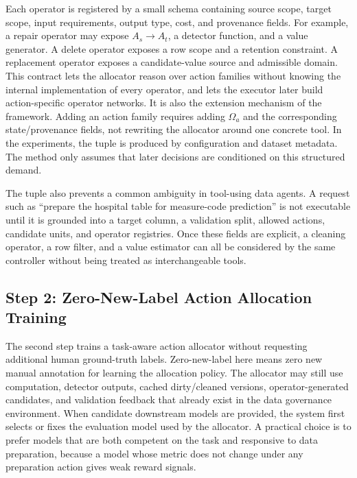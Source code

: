 \documentclass[sigconf, nonacm]{acmart}
\begin{document}
Each operator is registered by a small schema containing source scope, target scope, input requirements, output type, cost, and provenance fields. For example, a repair operator may expose $A_s\rightarrow A_t$, a detector function, and a value generator. A delete operator exposes a row scope and a retention constraint. A replacement operator exposes a candidate-value source and admissible domain. This contract lets the allocator reason over action families without knowing the internal implementation of every operator, and lets the executor later build action-specific operator networks. It is also the extension mechanism of the framework. Adding an action family requires adding $\Omega_a$ and the corresponding state/provenance fields, not rewriting the allocator around one concrete tool. In the experiments, the tuple is produced by configuration and dataset metadata. The method only assumes that later decisions are conditioned on this structured demand.

The tuple also prevents a common ambiguity in tool-using data agents. A request such as ``prepare the hospital table for measure-code prediction'' is not executable until it is grounded into a target column, a validation split, allowed actions, candidate units, and operator registries. Once these fields are explicit, a cleaning operator, a row filter, and a value estimator can all be considered by the same controller without being treated as interchangeable tools.

\subsection{Step 2: Zero-New-Label Action Allocation Training}

The second step trains a task-aware action allocator without requesting additional human ground-truth labels. Zero-new-label here means zero new manual annotation for learning the allocation policy. The allocator may still use computation, detector outputs, cached dirty/cleaned versions, operator-generated candidates, and validation feedback that already exist in the data governance environment. When candidate downstream models are provided, the system first selects or fixes the evaluation model used by the allocator. A practical choice is to prefer models that are both competent on the task and responsive to data preparation, because a model whose metric does not change under any preparation action gives weak reward signals.
\end{document}
